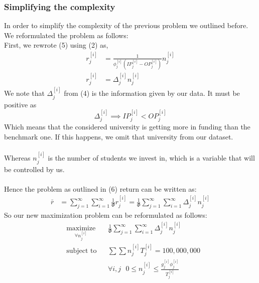 \documentclass[12pt]{scrartcl}
\begin{document}
	\subsubsection{Simplifying the complexity}
		In order to simplify the complexity of the previous problem we outlined before. We reformulated the problem as follows:\\
		First, we rewrote (5) using (2) as,
		\begin{equation}
			\begin{aligned}
			r_j^{[i]} &= \frac{1 }{ \phi_j^{[i]} (IP_j^{[i]} - OP_j^{[i]} ) } n_j^{[i]}\\ 
			r_j^{[i]} &= \Delta_j^{[i]} n_j^{[i]}
			\end{aligned}
		\end{equation}	
		We note that $\Delta_j^{[i]}$ from (4) is the information given by our data. It must be positive as $$\Delta_j^{[i]}\implies IP_j^{[i]} < OP_j^{[i]}$$
		Which means that the considered university is getting more in funding than the benchmark one. If this happens, we omit that university from our dataset.\\ 
		\\
		Whereas $n_j^{[i]}$ is the number of students we invest in, which is a variable that will be controlled by us.\\
		\\
		Hence the problem as outlined in (6) return can be written as:
		\begin{align}
			\bar{r} &= \sum_{j=1}^\infty\sum_{i=1}^\infty \frac{ 1  }{ \Phi } r_j^{[i]} = \frac{ 1  }{ \Phi }\sum_{j=1}^\infty\sum_{i=1}^\infty \Delta_j^{[i]}n_j^{[i]}
		\end{align}
		So our new maximization problem can be reformulated as follows:
		\begin{equation}
				\begin{aligned}
					& \underset{\forall n_j^{[i]}}{\text{maximize}}
					& &\frac{ 1  }{ \Phi }\sum_{j=1}^\infty\sum_{i=1}^\infty \Delta_j^{[i]}n_j^{[i]}\\
					& \text{subject to}
					& & \sum \sum n_j^{[i]}T_j^{[i]} = 100,000,000\\
					&&& \forall i,j \ \ \ 0\le n_j^{[i]} \le \frac{g_j^{[i]}\phi_j^{[i]}}{T_j^{[i]}}
				\end{aligned}	
		\end{equation}
\end{document}
